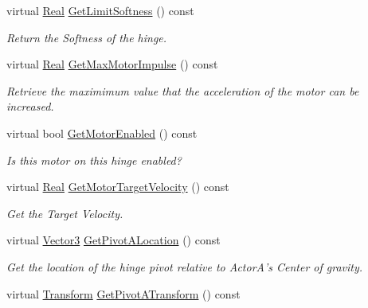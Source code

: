 \begin{DoxyCompactItemize}
virtual \hyperlink{namespaceMezzanine_a726731b1a7df72bf3583e4a97282c6f6}{Real} \hyperlink{classMezzanine_1_1HingeConstraint_aa5202368b6de6721f0f6f96b6210e83f}{GetLimitSoftness} () const 
\begin{DoxyCompactList}\small\item\em Return the Softness of the hinge. \item\end{DoxyCompactList}\item 
virtual \hyperlink{namespaceMezzanine_a726731b1a7df72bf3583e4a97282c6f6}{Real} \hyperlink{classMezzanine_1_1HingeConstraint_a02ea6dc2a0e80649737c4c478fec274d}{GetMaxMotorImpulse} () const 
\begin{DoxyCompactList}\small\item\em Retrieve the maximimum value that the acceleration of the motor can be increased. \item\end{DoxyCompactList}\item 
virtual bool \hyperlink{classMezzanine_1_1HingeConstraint_adcc717f158be2173d179004a6b8d2b11}{GetMotorEnabled} () const 
\begin{DoxyCompactList}\small\item\em Is this motor on this hinge enabled? \item\end{DoxyCompactList}\item 
virtual \hyperlink{namespaceMezzanine_a726731b1a7df72bf3583e4a97282c6f6}{Real} \hyperlink{classMezzanine_1_1HingeConstraint_ab357a37ce5a447b007cbaef74c4b47d5}{GetMotorTargetVelocity} () const 
\begin{DoxyCompactList}\small\item\em Get the Target Velocity. \item\end{DoxyCompactList}\item 
virtual \hyperlink{classMezzanine_1_1Vector3}{Vector3} \hyperlink{classMezzanine_1_1HingeConstraint_a74f1b8d8de18ab991d2f42c7141eedc7}{GetPivotALocation} () const 
\begin{DoxyCompactList}\small\item\em Get the location of the hinge pivot relative to ActorA's Center of gravity. \item\end{DoxyCompactList}\item 
virtual \hyperlink{classMezzanine_1_1Transform}{Transform} \hyperlink{classMezzanine_1_1HingeConstraint_a208687c856410bf70f068ddf8c8f9161}{GetPivotATransform} () const 

\end{DoxyCompactItemize}
